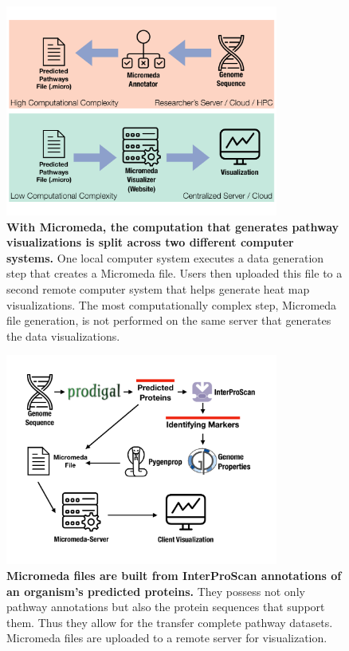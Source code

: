 \begin{figure}[!ht]
  \centering
	\includegraphics[width=0.8\textwidth]{media/micromeda-file-generation.pdf}
	 \caption[With Micromeda, the computation that generates pathway visualizations is split across two different computer systems.]{\textbf{With Micromeda, the computation that generates pathway visualizations is split across two different computer systems.} One local computer system executes a data generation step that creates a Micromeda file. Users then uploaded this file to a second remote computer system that helps generate heat map visualizations. The most computationally complex step, Micromeda file generation, is not performed on the same server that generates the data visualizations.}
	 \label{fig:micromeda-file-generation}
\end{figure}

\begin{figure}[!ht]
  \centering
	\includegraphics[width=0.8\textwidth]{media/how-micromeda-files-are-built.pdf}
	 \caption[Micromeda files are built from InterProScan annotations of an organism's predicted proteins.]{\textbf{Micromeda files are built from InterProScan annotations of an organism's predicted proteins.} They possess not only pathway annotations but also the protein sequences that support them. Thus they allow for the transfer complete pathway datasets. Micromeda files are uploaded to a remote server for visualization.}
	 \label{fig:micromeda-file-building-and-use}
\end{figure}

